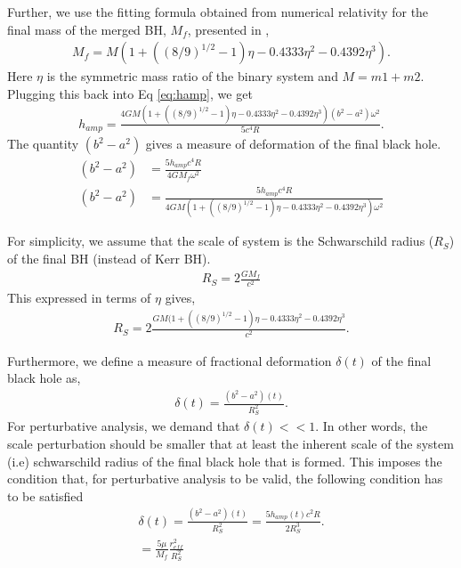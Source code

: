 Further, we use the fitting formula obtained from numerical relativity for the final mass of the merged BH, $M_{f}$, presented in \cite{2011PhRvD..84l4052P},
\begin{align}
M_{f}=M  (1+ ((8/9)^{1/2} -1)\eta -0.4333 \eta^{2} -0.4392 \eta^{3}).
\end{align}
Here $\eta$ is the symmetric mass ratio of the binary system and $M=m1+m2$.
Plugging this back into Eq \ref{eq:hamp}, we get 
\begin{align}
h_{amp}=\frac{4 G M  (1+ ((8/9)^{1/2} -1)\eta -0.4333 \eta^{2} -0.4392 \eta^{3}) (b^{2}-a^{2}) \omega^{2}}{5 c^4 R}.
\end{align}
The quantity $(b^{2}-a^{2})$ gives a measure of deformation of the final black hole.
\begin{align}
(b^{2}-a^{2}) &= \frac{5 h_{amp} c^4 R}{4 G M_{f}\omega^{2}}
\\(b^{2}-a^{2}) &=\frac{5 h_{amp} c^4 R}{4 G M  (1+ ((8/9)^{1/2} -1)\eta -0.4333 \eta^{2} -0.4392 \eta^{3})\omega^{2}}
\end{align}

For simplicity, we assume that the scale of system is the Schwarschild radius ($R_{S}$) of the final BH (instead of Kerr BH). 
\begin{align}
R_{S}= 2 \frac{G M_{f}}{c^2}
\end{align}
This expressed in terms of $\eta$ gives,
\begin{align}
R_{S}= 2 \frac{G M  (1+ ((8/9)^{1/2} -1)\eta -0.4333 \eta^{2} -0.4392 \eta^{3}}{c^2}.
\end{align}

Furthermore, we define a measure of fractional deformation $\delta(t)$ of the final black hole as,
\begin{align}
\delta(t)=\frac{(b^{2}-a^{2})(t)}{R_{S}^{2}}.
\end{align}
For perturbative analysis, we demand that $\delta(t)<<1$. In other words, the scale perturbation should be smaller that at least the inherent scale of the system (i.e) schwarschild radius of the final black hole that is formed. This imposes the condition that, for perturbative analysis to be valid, the following condition has to be satisfied
\begin{align}
\label{eq:deformation}
\delta(t)=\frac{(b^{2}-a^{2})(t)}{R_{S}^{2}}=\frac{5 h_{amp}(t) c^2 R}{2 R^{3}_{S}}.
\\ =\frac{5 \mu}{M_{f}}\frac{r^{2}_{eff}}{R^{2}_{S}}
\end{align}


